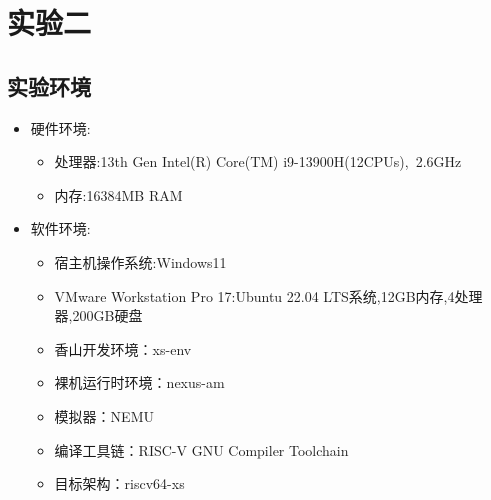 \section{实验二}
\subsection{实验环境}
\begin{itemize}
 \item 硬件环境:
\begin{itemize}
    \item 处理器:13th Gen Intel(R) Core(TM) i9-13900H(12CPUs),~2.6GHz
    \item 内存:16384MB RAM
 \end{itemize}
 
 \item 软件环境:
 \begin{itemize}
    \item 宿主机操作系统:Windows11
    \item VMware Workstation Pro 17:Ubuntu 22.04 LTS系统,12GB内存,4处理器,200GB硬盘
    \item 香山开发环境：xs-env
    \item 裸机运行时环境：nexus-am
    \item 模拟器：NEMU
    \item 编译工具链：RISC-V GNU Compiler Toolchain
    \item 目标架构：riscv64-xs
 \end{itemize}
\end{itemize}